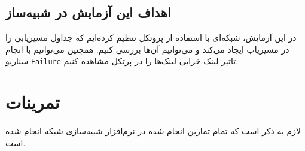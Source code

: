 \documentclass[a4paper]{article}
\begin{document}
\subsection{اهداف این آزمایش در شبیه‌ساز }

در این آزمایش، شبکه‌ای با استفاده از پروتکل  تنظیم کرده‌ایم که جداول 
مسیریابی را در مسیریاب ایجاد می‌کند و می‌توانیم آن‌ها بررسی کنیم. همچنین
می‌توانیم با انجام سناریو \texttt{Failure} تاثیر لینک خرابی لینک‌ها را در پرتکل
 مشاهده کنیم.

\section{تمرینات}

لازم به ذکر است که تمام تمارین انجام شده در نرم‌افزار شبیه‌سازی شبکه 
انجام شده است.
\end{document}
